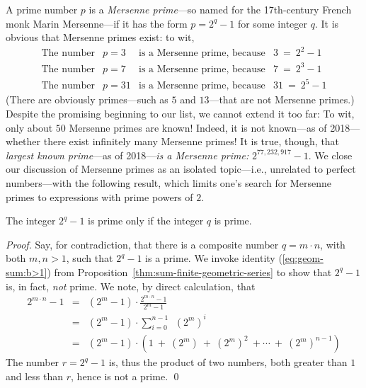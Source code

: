 A prime number $p$ is a {\it Mersenne prime}---so named for the
17th-century French monk Marin 
 Mersenne---if it has the form $p
= 2^q -1$ for some integer $q$.  It is obvious that Mersenne primes
exist: to wit,
\begin{equation}
\label{eq:sample-mersennes}
\begin{array}{lclc}
\mbox{The number} & p=3 & 
  \mbox{is a Mersenne prime, because} & 3 \ = \ 2^2 -1 \\
\mbox{The number} & p=7 &
  \mbox{is a Mersenne prime, because} & 7 \ = \ 2^3 -1 \\
\mbox{The number} & p=31 &
  \mbox{is a Mersenne prime, because} & 31 \ = \ 2^5 -1
\end{array}
\end{equation}
(There are obviously primes---such as $5$ and $13$---that are not
Mersenne primes.)  Despite the promising beginning to our list, we
cannot extend it too far: To wit, only about $50$ Mersenne primes are
known!  Indeed, it is not known---as of 2018---whether there exist
infinitely many Mersenne primes!  It is true, though, that {\em
  largest known prime}---as of 2018---{\em is a Mersenne prime:}
$2^{77,232,917} -1$.   We close our
discussion of Mersenne primes as an isolated topic---i.e., unrelated
to perfect numbers---with the following result, which limits one's
search for Mersenne primes to expressions with prime powers of $2$.

\begin{prop}
\label{thm:Mersenne-needs-prime-exponent}
The integer $2^q -1$ is prime only if the integer $q$ is prime.
\end{prop}

\begin{proof}
Say, for contradiction, that there is a composite number $q = m \cdot
n$, with both $m, n > 1$, such that $2^q -1$ is a prime.  We invoke
identity (\ref{eq:geom-sum:b>1}) from
Proposition~\ref{thm:sum-finite-geometric-series} to show that $2^q
-1$ is, in fact, {\em not} prime.  We note, by direct calculation,
that
\begin{eqnarray}
\nonumber
2^{m \cdot n} -1 & = & (2^m -1) \cdot \frac{2^{m \cdot n} -1}{2^m -1} \\
\nonumber
  & = & (2^m -1) \cdot \sum_{i=0}^{n-1} \ \ (2^m)^{i} \\
\label{eq:Mersenne-factors}
  & = & (2^m -1) \cdot \left( 1 \ + \ (2^m) \ + \ (2^m)^2 \ + \cdots
            \ + \ (2^m)^{n-1} \right)
\end{eqnarray}
The number $r = 2^q - 1$ is, thus the product of two numbers, both
greater than $1$ and less than $r$, hence is not a prime.
\qed
\end{proof}

